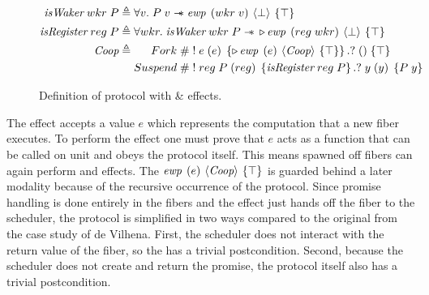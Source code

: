 \begin{figure}[ht]
  \begin{align*}
    \gsIsWaker{}\; wkr\; P & \triangleq \forall v.   \;  P\; v \wand{} \ewp{wkr\; v}{\bot}{\top}\label{spec:is_waker}                                                  \\
    \gsIsReg{}\; reg\; P   & \triangleq \forall wkr. \; \gsIsWaker{}\; wkr\; P \wand{} \later \ewp{reg\; wkr}{\bot}{\top}                                              \\
    \proto{}               & \triangleq \begin{aligned}[t]
                                          Fork\;    & \# \; !\; e\; (e)\; \left\{\later \ewp{e}{\proto{}}{\top}\right\}. ?\; ()\; \{ \top \}               \\
                                          Suspend\; & \# \; !\; reg\; P\; (reg)\; \left\{\gsIsReg{}\; reg\; P\right\}.?\; y\; (y)\; \left\{ P\; y \right\}
                                        \end{aligned}
  \end{align*}
  \caption{Definition of \proto{} protocol with \efork{} \& \esuspend{} effects.}
  \label{fig:coop-protocol-simpl}\label{spec:suspend}
\end{figure}

The \efork{} effect accepts a value \(e\) which represents the computation that a new fiber executes.
To perform the effect one must prove that \(e\) acts as a function that can be called on unit and obeys the \proto{} protocol itself.
This means spawned off fibers can again perform \efork{} and \esuspend{} effects.
The \(\ewp{e}{\proto{}}{\top}\) is guarded behind a later modality because of the recursive occurrence of the \proto{} protocol.
Since promise handling is done entirely in the fibers and the \efork{} effect just hands off the fiber to the scheduler, the protocol is simplified in two ways compared to the original from the case study of de Vilhena.
First, the scheduler does not interact with the return value of the fiber, so the \ewpt{} has a trivial postcondition.
Second, because the scheduler does not create and return the promise, the protocol itself also has a trivial postcondition.

